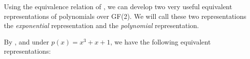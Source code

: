 Using the equivalence relation of ,
we can develop two very useful equivalent representations of
polynomials over GF(2).
We will call these two representations the {\em exponential} representation
and the {\em polynomial} representation.

\begin{example}
\label{ex:representations}
By , and
under $p(x)=x^3+x+1$, we have the following equivalent representations:
\end{example}
